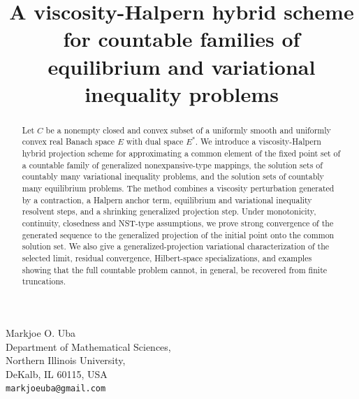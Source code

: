 \documentclass[leqno,12pt]{amsart}
\theoremstyle{definition}
\numberwithin{equation}{section}
\begin{document}
\title[A viscosity-Halpern hybrid scheme]{A viscosity-Halpern hybrid scheme for countable families of equilibrium and variational inequality problems}


\maketitle
\begin{center}
 Markjoe O. Uba\\
 \vspace{.1in}
Department of Mathematical Sciences,\\ 
Northern Illinois University,\\ 
DeKalb, IL 60115, USA\\
{\tt markjoeuba@gmail.com}  
\end{center}

\begin{abstract}
Let $C$ be a nonempty closed and convex subset of a uniformly smooth and uniformly convex real Banach space $E$ with dual space $E^{*}$. We introduce a viscosity-Halpern hybrid projection scheme for approximating a common element of the fixed point set of a countable family of generalized nonexpansive-type mappings, the solution sets of countably many variational inequality problems, and the solution sets of countably many equilibrium problems. The method combines a viscosity perturbation generated by a contraction, a Halpern anchor term, equilibrium and variational inequality resolvent steps, and a shrinking generalized projection step. Under monotonicity, continuity, closedness and NST-type assumptions, we prove strong convergence of the generated sequence to the generalized projection of the initial point onto the common solution set. We also give a generalized-projection variational characterization of the selected limit, residual convergence, Hilbert-space specializations, and examples showing that the full countable problem cannot, in general, be recovered from finite truncations.
\end{abstract}

\maketitle
\end{document}
